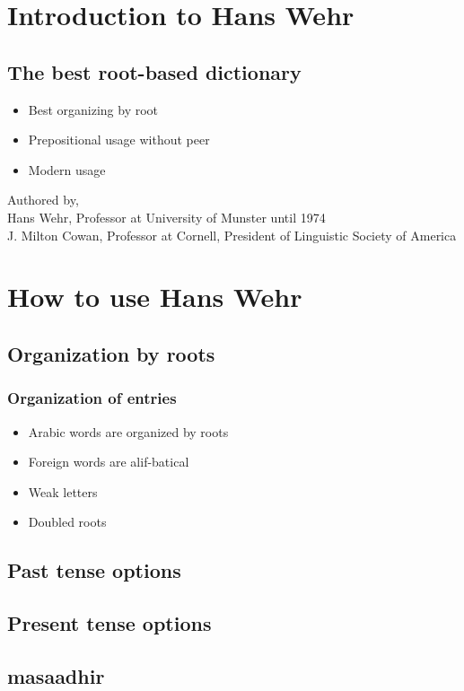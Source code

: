 \section{Introduction to Hans Wehr}
\subsection{The best root-based dictionary}
\begin{itemize}	    \setlength{\itemsep}{5pt}
	\item Best organizing by root
	\item Prepositional usage without peer
	\item Modern usage	
\end{itemize}
\noindent Authored by, \\
Hans Wehr, Professor at University of Munster until 1974 \\
J. Milton Cowan, Professor at Cornell, President of Linguistic Society of America

\section{How to use Hans Wehr}
\subsection{Organization by roots}
\subsubsection{Organization of entries}
\begin{itemize}	    \setlength{\itemsep}{5pt}
	\item Arabic words are organized by roots
	\item Foreign words are alif-batical
	\item Weak letters
	\item Doubled roots	
\end{itemize}
\subsection{Past tense options}
\subsection{Present tense options}
\subsection{masaadhir} %
